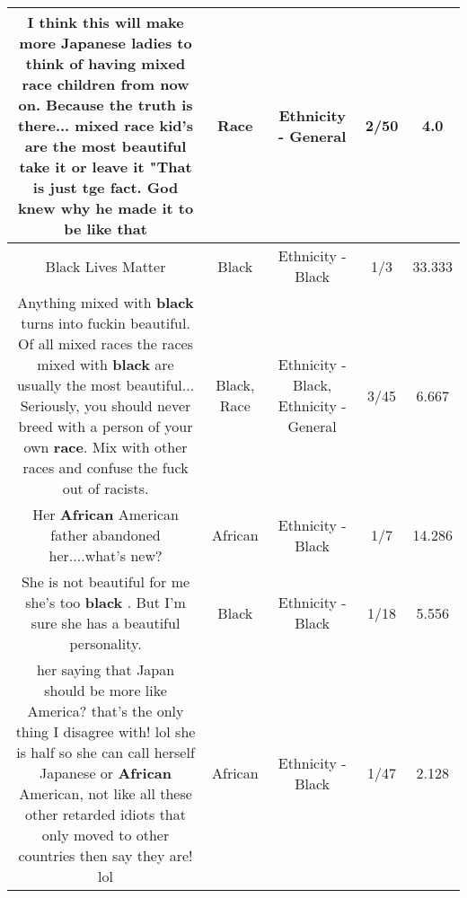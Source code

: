 \documentclass[11pt]{article}
\newlength\mylength
\begin{document}
\begin{center}
\begin{longtable}{|C{.65\mylength}|C{.30\mylength}|C{.12\mylength}|C{.12\mylength}|C{.12\mylength}|}
  \small I think this will make more Japanese ladies to think of having mixed \textbf{race} children from now on. Because the truth is there... mixed \textbf{race} kid's are the most beautiful take it or leave it "That is just tge fact. God knew why he made it to be like that\normalsize   & Race & Ethnicity - General & 2/50 & 4.0 \\  \hline
  \small Black Lives Matter\normalsize   & Black & Ethnicity - Black & 1/3 & 33.333 \\  \hline
  \small Anything mixed with \textbf{black} turns into fuckin beautiful. Of all mixed races the races mixed with \textbf{black} are usually the most beautiful... Seriously, you should never breed with a person of your own \textbf{race}. Mix with other races and confuse the fuck out of racists.\normalsize   & Black, Race & Ethnicity - Black, Ethnicity - General & 3/45 & 6.667 \\  \hline
  \small Her \textbf{African} American father abandoned her....what's new?\normalsize   & African & Ethnicity - Black & 1/7 & 14.286 \\  \hline
  \small She is not beautiful for me she's too \textbf{black} . But I'm sure she has a beautiful personality.\normalsize   & Black & Ethnicity - Black & 1/18 & 5.556 \\  \hline
  \small her saying that Japan should be more like America? that's the only thing I disagree with! lol she is half so she can call herself Japanese or \textbf{African} American, not like all these other retarded idiots that only moved to other countries then say they are! lol\normalsize   & African & Ethnicity - Black & 1/47 & 2.128 \\  \hline

\end{longtable}
\end{center}
\end{document}
